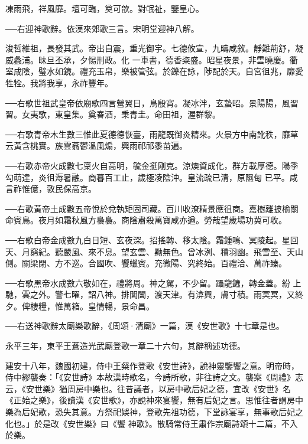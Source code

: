 \begin{pinyinscope}
 凍雨飛，祥風靡。壇可臨，奠可歆。對氓祉，鑒皇心。



 ──右迎神歌辭。依漢來郊歌三言。宋明堂迎神八解。



 浚哲維祖，長發其武。帝出自震，重光御宇。七德攸宣，九疇咸敘。靜難荊舒，凝威蠡浦。昧旦丕承，夕惕刑政。化
 一車書，德香粢盛。昭星夜景，非雲曉慶。衢室成陰，璧水如鏡。禮充玉帛，樂被管弦。於鑠在詠，陟配於天。自宮徂兆，靡愛牲牷。我將我享，永祚豐年。



 ──右歌世祖武皇帝依廟歌四言營翼日，鳥殷宵。凝冰泮，玄蟄昭。景陽陽，風習習。女夷歌，東皇集。奠春酒，秉青圭。命田祖，渥群黎。



 ──右歌青帝木生數三惟此夏德德恢臺，雨龍既御炎精來。火景方中南訛秩，靡草云黃含桃實。族雲蓊鬱溫風煽，興雨祁祁黍苗遍。



 ──右歌赤帝火成數七稟火自高明，毓金挺剛克。涼燠資成化，群方載厚德。陽季勾萌達，炎徂溽暑融。商暮百工止，歲極凌陰沖。皇流疏已清，原隰甸
 已平。咸言祚惟億，敦民保高京。



 ──右歌黃帝土成數五帝悅於兌執矩固司藏。百川收潦精景應徂商。嘉樹離披榆關命賓鳥。夜月如霜秋風方裊裊。商陰肅殺萬寶咸亦遒。勞哉望歲場功冀可收。



 ──右歌白帝金成數九白日短、玄夜深。招搖轉、移太陰。霜鍾鳴、冥陵起。星回天、月窮紀。聽嚴風、來不息。望玄雲、黝無色。曾冰洌、積羽幽。飛雪至、天山側。關梁閉、方不巡。合國吹、饗蠟賓。充微陽、究終始。百禮洽、萬祚臻。



 ──右歌黑帝水成數六敬如在，禮將周。神之駕，不少留。躡龍鑣，轉金蓋。紛
 上馳，雲之外。警七曜，詔八神。排閶闔，渡天津。有渰興，膚寸積。雨冥冥，又終夕。俾棲糧，惟萬箱。皇情暢，景命昌。



 ──右送神歌辭太廟樂歌辭，《周頌·清廟》一篇，漢《安世歌》十七章是也。



 永平三年，東平王蒼造光武廟登歌一章二十六句，其辭稱述功德。



 建安十八年，魏國初建，侍中王粲作登歌《安世詩》，說神靈鑒饗之意。明帝時，侍中繆襲奏：「《安世詩》本故漢時歌名，今詩所歌，非往詩之文。襲案《周禮》志云，《安世樂》猶周房中樂也。往昔議者，以房中歌后妃之德，宜改《安世》名《正始之樂》，後讀漢《安世歌》，亦說神來宴饗，無有后妃之言。思惟往者謂房中樂為后妃歌，恐失其意。方祭祀娛神，登歌先祖功德，下堂詠宴享，無事歌后妃之化也。」於是改《安世樂》曰《饗
 神歌》。散騎常侍王肅作宗廟詩頌十二篇，不入於樂。




\end{pinyinscope}
